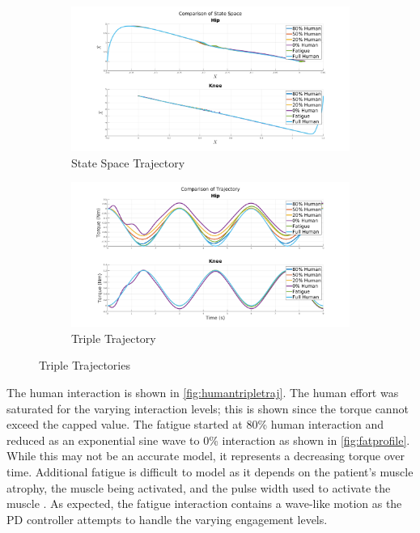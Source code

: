 \begin{figure}
    \centering
    \begin{subfigure}{\linewidth}
        \centering
        \includegraphics[width=\columnwidth]{images/controllers/trajs/statespace.png}
        \caption[State Space Trajectory]{State Space Trajectory}
        \label{fig:StateSpaceTrajectory}
    \end{subfigure}
    \begin{subfigure}{\linewidth}
        \centering
        \includegraphics[width=\columnwidth]{images/controllers/trajs/triple_traj.png}
        \caption[Triple Trajectory]{Triple Trajectory}
        \label{fig:TripleTrajectory}
    \end{subfigure}
    \caption[Triple Trajectory LARRE]{Triple Trajectories}
    \label{fig:TripleTraj}
\end{figure}



The human interaction is shown in \autoref{fig:humantripletraj}. The human effort was saturated for the varying interaction levels; this is shown since the torque cannot exceed the capped value. The fatigue started at 80\% human interaction and reduced as an exponential sine wave to 0\% interaction as shown in \autoref{fig:fatprofile}. While this may not be an accurate model, it represents a decreasing torque over time. Additional fatigue is difficult to model as it depends on the patient's muscle atrophy, the muscle being activated, and the pulse width used to activate the muscle \cite{reiner1998patient}. As expected, the fatigue interaction contains a wave-like motion as the PD controller attempts to handle the varying engagement levels. 


